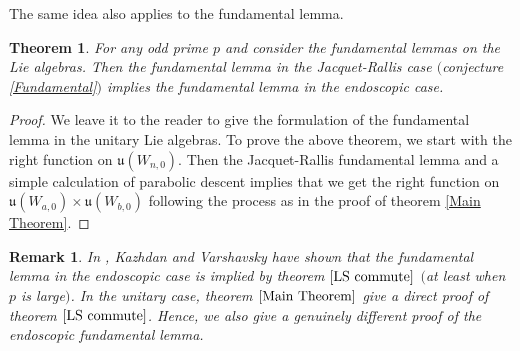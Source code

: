 \documentclass[11pt, oneside,reqno]{amsart}   	%
\newtheorem{theorem}{Theorem}[section]
\newtheorem*{remark}{Remark}
\begin{document}
The same idea also applies to the fundamental lemma.

\begin{theorem}
For any odd prime $p$ and consider the fundamental lemmas on the Lie algebras. Then the fundamental lemma in the Jacquet-Rallis case $($conjecture \textup{\ref{Fundamental}}$)$ implies the fundamental lemma in the endoscopic case. 
\end{theorem}

\begin{proof}
We leave it to the reader to give the formulation of the fundamental lemma in the unitary Lie algebras. To prove the above theorem, we start with the right function on $\mathfrak{u}(W_{n,0})$. Then the Jacquet-Rallis fundamental lemma and a simple calculation of parabolic descent implies that we get the right function on  $\mathfrak{u}(W_{a,0})\times  \mathfrak{u}(W_{b,0})$ following the process as in the proof of theorem \ref{Main Theorem}.
\end{proof}

\begin{remark}
In \cite{Kazhdan}, Kazhdan and Varshavsky have shown that the fundamental lemma in the endoscopic case is implied by theorem $\ref{LS commute}$ $($at least when $p$ is large$)$. In the unitary case, theorem $\ref{Main Theorem}$ give a direct proof of theorem $\ref{LS commute}$. Hence, we also give a genuinely different proof of the endoscopic fundamental lemma. 
\end{remark}
\end{document}
